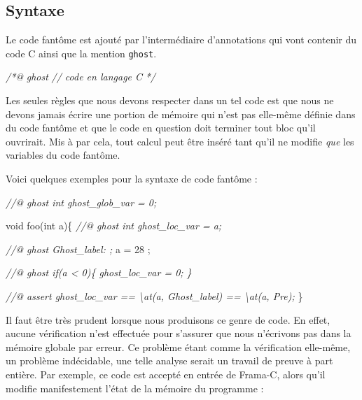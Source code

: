 \documentclass[12pt,francais,]{scrbook}
\newenvironment{Shaded}{}{}
\newcommand{\DataTypeTok}[1]{\textcolor[rgb]{0.56,0.13,0.00}{{#1}}}
\newcommand{\DecValTok}[1]{\textcolor[rgb]{0.25,0.63,0.44}{{#1}}}
\newcommand{\CommentTok}[1]{\textcolor[rgb]{0.38,0.63,0.69}{\textit{{#1}}}}
\newcommand{\NormalTok}[1]{{#1}}
\begin{document}
\subsection{Syntaxe}\label{syntaxe-4}

Le code fantôme est ajouté par l'intermédiaire d'annotations qui vont
contenir du code C ainsi que la mention \texttt{ghost}.

\begin{footnotesize}\begin{Shaded}
\begin{Highlighting}[]
\CommentTok{/*@}
\CommentTok{  ghost}
\CommentTok{  // code en langage C}
\CommentTok{*/}
\end{Highlighting}
\end{Shaded}\end{footnotesize}

Les seules règles que nous devons respecter dans un tel code est que
nous ne devons jamais écrire une portion de mémoire qui n'est pas
elle-même définie dans du code fantôme et que le code en question doit
terminer tout bloc qu'il ouvrirait. Mis à par cela, tout calcul peut
être inséré tant qu'il ne modifie \emph{que} les variables du code
fantôme.

Voici quelques exemples pour la syntaxe de code fantôme :

\begin{footnotesize}\begin{Shaded}
\begin{Highlighting}[]
\CommentTok{//@ ghost int ghost_glob_var = 0;}

\DataTypeTok{void} \NormalTok{foo(}\DataTypeTok{int} \NormalTok{a)\{}
  \CommentTok{//@ ghost int ghost_loc_var = a;}

  \CommentTok{//@ ghost Ghost_label: ;}
  \NormalTok{a = }\DecValTok{28} \NormalTok{;}

  \CommentTok{//@ ghost if(a < 0)\{ ghost_loc_var = 0; \}}

  \CommentTok{//@ assert ghost_loc_var == \textbackslash{}at(a, Ghost_label) == \textbackslash{}at(a, Pre);}
\NormalTok{\}}
\end{Highlighting}
\end{Shaded}\end{footnotesize}

Il faut être très prudent lorsque nous produisons ce genre de code. En
effet, aucune vérification n'est effectuée pour s'assurer que nous
n'écrivons pas dans la mémoire globale par erreur. Ce problème étant
comme la vérification elle-même, un problème indécidable, une telle
analyse serait un travail de preuve à part entière. Par exemple, ce code
est accepté en entrée de Frama-C, alors qu'il modifie manifestement
l'état de la mémoire du programme :
\end{document}
